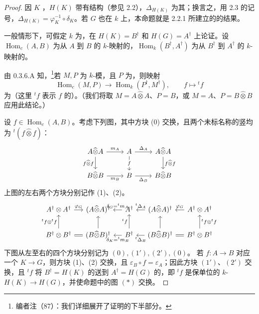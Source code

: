 \begin{proof}
因 $K$ ，$H(K)$ 带有结构（参见 2.2），$\Delta_{H(K)}$ 为其；换言之，用 2.3 的记号，$\Delta_{H(K)}=\varphi_K^{-1}\circ\delta_K$。若 $G$ 也在 $k$ 上，本命题就是 2.2.1 所建立的的结果。

一般情形下，可假定 $k$ 为，在 $H(K)=B^\dagger$ 和 $H(G)=A^\dagger$ 上论证。设 $\operatorname{Hom}_c(A,B)$ 为从 $A$ 到 $B$ 的 $k$-映射的，$\operatorname{Hom}_k(B^\dagger,A^\dagger)$ 为从 $B^\dagger$ 到 $A^\dagger$ 的 $k$-映射的。

由 0.3.6.A 知，\footnote{编者注（87）：我们详细展开了证明的下半部分。}若 $M,P$ 为 $k$-模，且 $P$ 为，则映射
\[
\operatorname{Hom}_c(M,P)\longrightarrow\operatorname{Hom}_k(P^\dagger,M^\dagger),\qquad f\longmapsto{}^tf
\]
为（这里 ${}^tf$ 表示 $f$ 的）。（我们将取 $M=A\widehat\otimes A$、$P=B$，或 $M=A$、$P=B\widehat\otimes B$ 应用此结论。）

设 $f\in\operatorname{Hom}_c(A,B)$。考虑下列图，其中方块 (0) 交换，且两个未标名称的竖均为 ${}^t(f\widehat\otimes f)$：
\[
\begin{tikzcd}
A\widehat\otimes A\arrow[r,"m_A"]\arrow[d,"f\widehat\otimes f"']&A\arrow[r,"\Delta_A"]\arrow[d,"f" description]&A\widehat\otimes A\arrow[d,"f\widehat\otimes f"]\\
B\widehat\otimes B\arrow[r,"m_B"']&B\arrow[r,"\Delta_B"']&B\widehat\otimes B
\end{tikzcd}
\]
上图的左右两个方块分别记作 (1)、(2)。
\[
\begin{tikzcd}[column sep=small]
A^\dagger\otimes A^\dagger\arrow[r,"\varphi_G"]&(A\widehat\otimes A)^\dagger&A^\dagger\arrow[l,"\delta_G={}^tm_A"']&(A\widehat\otimes A)^\dagger\arrow[l,"{}^t\Delta_A"']&A^\dagger\otimes A^\dagger\arrow[l,"\varphi_G"']\\
B^\dagger\otimes B^\dagger\arrow[u,"{}^tf\otimes{}^tf"]\arrow[r,equal]&(B\widehat\otimes B)^\dagger\arrow[u]&B^\dagger\arrow[u,"{}^tf"]\arrow[l,"\delta_K={}^tm_B"]&(B\widehat\otimes B)^\dagger\arrow[u]\arrow[l,"{}^t\Delta_B"]&B^\dagger\otimes B^\dagger\arrow[u,"{}^tf\otimes{}^tf"']\arrow[l,equal]
\end{tikzcd}
\]
下图从左至右的四个方块分别记为 $(0),(1'),(2'),(0)$。
若 $f:A\to B$ 对应一个 $K\to G$，则方块 (1)、(2) 交换，且 $\varepsilon_B\circ f=\varepsilon_A$；因此方块 $(1')$、$(2')$ 交换，且 ${}^tf$ 将 $B^\dagger=H(K)$ 的送到 $A^\dagger=H(G)$ 的，即 ${}^tf$ 是保单位的 $k$- $H(K)\to H(G)$，并使命题中的图 $(*)$ 交换。


\end{proof}
